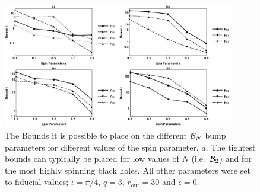 \begin{figure}[t]
 \centering
 \includegraphics[trim=0cm 0cm 0cm 0cm, width=0.9\textwidth]{fig_summary.pdf}
 \caption{The Bounds it is possible to place on the different ${\cal{B}}_{N}$ bump parameters for different values of the spin parameter, $a$. The tightest bounds can typically be placed for low values of $N$ (i.e.\ ${\cal{B}}_{2}$) and for the most highly spinning black holes. All other parameters were set to fiducial values; $\iota=\pi/4$, $q=3$, $r_{\textrm{out}}=30$ and $\epsilon =0$.}
 \label{fig:summary}
\end{figure}



